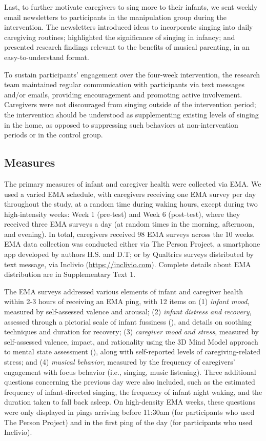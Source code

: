\documentclass[
]{article}
\begin{document}
Last, to further motivate caregivers to sing more to their infants, we
sent weekly email newsletters to participants in the manipulation group
during the intervention. The newsletters introduced ideas to incorporate
singing into daily caregiving routines; highlighted the significance of
singing in infancy; and presented research findings relevant to the
benefits of musical parenting, in an easy-to-understand format.

To sustain participants' engagement over the four-week intervention, the
research team maintained regular communication with participants via
text messages and/or emails, providing encouragement and promoting
active involvement. Caregivers were not discouraged from singing outside
of the intervention period; the intervention should be understood as
supplementing existing levels of singing in the home, as opposed to
suppressing such behaviors at non-intervention periods or in the control
group.

\subsection{Measures}\label{measures}

The primary measures of infant and caregiver health were collected via
EMA. We used a varied EMA schedule, with caregivers receiving one EMA
survey per day throughout the study, at a random time during waking
hours, except during two high-intensity weeks: Week 1 (pre-test) and
Week 6 (post-test), where they received three EMA surveys a day (at
random times in the morning, afternoon, and evening). In total,
caregivers received 98 EMA surveys across the 10 weeks. EMA data
collection was conducted either via The Person Project, a smartphone app
developed by authors H.S. and D.T; or by Qualtrics surveys distributed
by text message, via Inclivio (\url{https://inclivio.com}). Complete
details about EMA distribution are in Supplementary Text 1.

The EMA surveys addressed various elements of infant and caregiver
health within 2-3 hours of receiving an EMA ping, with 12 items on (1)
\emph{infant mood}, measured by self-assessed valence and arousal; (2)
\emph{infant distress and recovery}, assessed through a pictorial scale
of infant fussiness (), and
details on soothing techniques and duration for recovery; (3)
\emph{caregiver mood and stress}, measured by self-assessed valence,
impact, and rationality using the 3D Mind Model approach to mental state
assessment (), along
with self-reported levels of caregiving-related stress; and (4)
\emph{musical behavior}, measured by the frequency of caregivers'
engagement with focus behavior (i.e., singing, music listening). Three
additional questions concerning the previous day were also included,
such as the estimated frequency of infant-directed singing, the
frequency of infant night waking, and the duration taken to fall back
asleep. On high-density EMA weeks, these questions were only displayed
in pings arriving before 11:30am (for participants who used The Person
Project) and in the first ping of the day (for participants who used
Inclivio).
\end{document}
